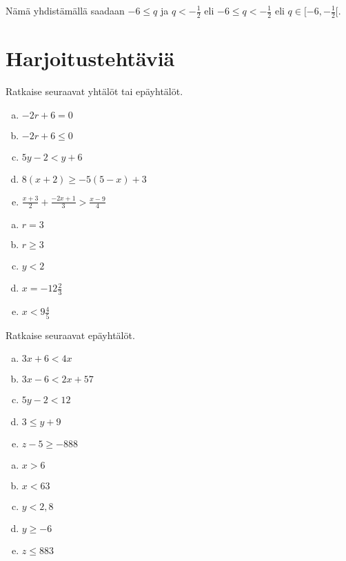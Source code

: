 Nämä yhdistämällä saadaan $-6\leq q$ ja $q< -\frac12$ eli $-6\leq q < -\frac12$ eli $q\in [-6, -\frac12[$.

\section{Harjoitustehtäviä}

\begin{tehtava}
    Ratkaise seuraavat yhtälöt tai epäyhtälöt.
    \begin{enumerate}[a)]
        \item $-2r+6=0$
        \item $-2r+6\leq 0$
        \item $5y-2<y+6$
        \item $8(x+2)\geq -5(5-x)+3$
        \item $\frac{x+3}{2}+\frac{-2x+1}{3}>\frac{x-9}{4}$
    \end{enumerate}
    \begin{vastaus}
        \begin{enumerate}[a)]
            \item $r=3$
            \item $r\geq 3$
            \item $y<2$
            \item $x=-12\frac{2}{3}$
            \item $x<9\frac{4}{5}$
        \end{enumerate}
    \end{vastaus}
\end{tehtava}

\begin{tehtava}
    Ratkaise seuraavat epäyhtälöt.
    \begin{enumerate}[a)]
        \item $3x+6<4x$
        \item $3x-6<2x+57$
        \item $5y-2<12$
        \item $3\leq y+9$
        \item $z-5\geq-888$
    \end{enumerate}
    \begin{vastaus}
        \begin{enumerate}[a)]
            \item $x>6$
            \item $x<63$
            \item $y<2,8$
            \item $y\geq -6$
            \item $z\leq 883$
        \end{enumerate}
    \end{vastaus}
\end{tehtava}

